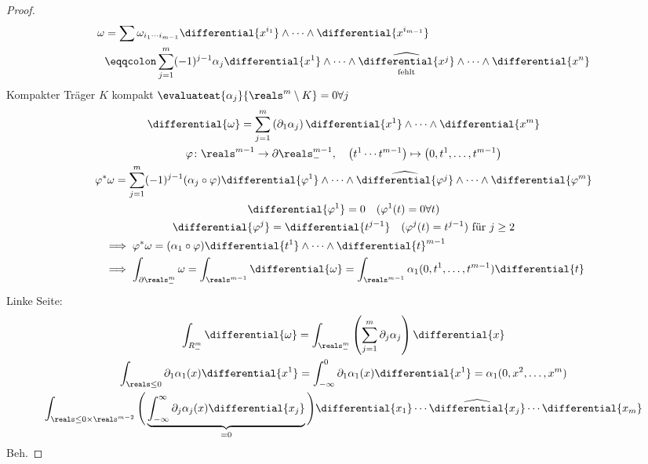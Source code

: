\begin{proof}
  \begin{align*}
      \omega &= \sum \omega_{i_1\cdots i_{m-1}}\differential{x^{i_1}}\wedge\dotsb \wedge\differential{x^{i_{m-1}}}\\
      &\eqqcolon \sum_{j=1}^{m}(-1)^{j-1}\alpha_j\differential{x^1}\wedge\dotsb \wedge \underset{\text{fehlt}}{\widehat{\differential{x^j}}}\wedge\dotsb\wedge\differential{x^n}
  \end{align*}
  Kompakter Träger \timplies \texists \( K \) kompakt \sd \( \evaluateat{\alpha_j}{\reals^m\setminus K}=0 \forall j \)
  \begin{gather*}
      \differential{\omega}=\sum_{j=1}^{m}\left( \partial_1\alpha_j \right)\differential{x^1}\wedge\dotsb \wedge\differential{x^m}\\
      \varphi\colon \reals^{m-1}\to \partial\reals_-^{m-1},\quad \left( t^1\dotsm t^{m-1} \right) \mapsto \left( 0,t^1,\dotsc ,t^{m-1} \right)\\
      \varphi^*\omega=\sum_{j=1}^{m}(-1)^{j-1}(\alpha_j\circ\varphi)\differential{\varphi^1}\wedge\dotsb \wedge\widehat{\differential{\varphi^j}}\wedge\dotsb \wedge\differential{\varphi^m}\\
      \differential{\varphi^1}=0\quad (\varphi^1(t)=0 \forall t)\\
      \differential{\varphi^j}=\differential{t^{j-1}}\quad (\varphi^j(t)=t^{j-1})\text{ für }j\geq 2\\
      \begin{aligned}[t]
          &\implies \varphi^*\omega=(\alpha_1\circ\varphi)\differential{t^1}\wedge \dotsb \wedge \differential{t}^{m-1}\\
          &\implies \int_{\partial\reals_-^m}\omega=\int_{\reals^{m-1}}\differential{\omega}=\int_{\reals^{m-1}}\alpha_1(0,t^1,\dotsc ,t^{m-1})\differential{t}
      \end{aligned}
  \end{gather*}
  Linke Seite:
  \begin{gather*}
      \int_{R_-^m}\differential{\omega}=\int_{\reals_-^m}\left( \sum_{j=1}^{m}\partial_j\alpha_j \right)\differential{x}\\
      \int_{\reals\leq 0}\partial_1\alpha_1(x)\differential{x^1}=\int_{-\infty}^{0}\partial_1\alpha_1(x)\differential{x^1}=\alpha_1(0,x^2,\dotsc ,x^m)\\
      \int_{\reals\leq 0\times \reals^{m-2}}\Bigg(
      \underbrace{\int_{-\infty}^{\infty}\partial_j\alpha_j(x)\differential{x_j}}_{=0}    
      \Bigg)\differential{x_1}\dotsb \widehat{\differential{x_j}}\dotsb \differential{x_m}
  \end{gather*}
  \timplies Beh.
\end{proof}

